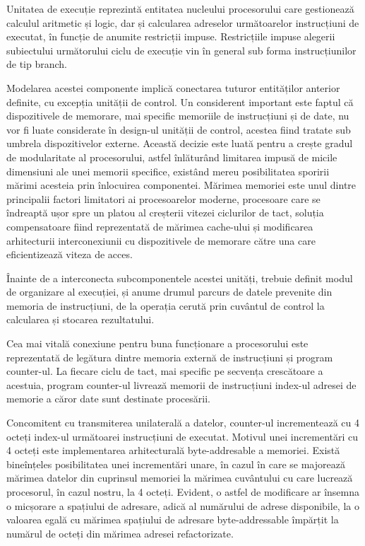 \documentclass[12pt]{article}
\begin{document}
Unitatea de execuție reprezintă entitatea nucleului procesorului care gestionează calculul aritmetic și logic, dar și calcularea adreselor următoarelor instrucțiuni de executat, în funcție de anumite restricții impuse. Restricțiile impuse alegerii subiectului următorului ciclu de execuție vin în general sub forma instrucțiunilor de tip branch. 
 
Modelarea acestei componente implică conectarea tuturor entităților anterior definite, cu excepția unității de control. Un considerent important este faptul că dispozitivele de memorare, mai specific memoriile de instrucțiuni și de date, nu vor fi luate considerate în design-ul unității de control, acestea fiind tratate sub umbrela dispozitivelor externe. Această decizie este luată pentru a crește gradul de modularitate al procesorului, astfel înlăturând limitarea impusă de micile dimensiuni ale unei memorii specifice, existând mereu posibilitatea sporirii mărimi acesteia prin înlocuirea componentei. Mărimea memoriei este unul dintre principalii factori limitatori ai procesoarelor moderne, procesoare care se îndreaptă ușor spre un platou al creșterii vitezei ciclurilor de tact, soluția compensatoare fiind reprezentată de mărimea cache-ului și modificarea arhitecturii interconexiunii cu dispozitivele de memorare către una care eficientizează viteza de acces.

Înainte de a interconecta subcomponentele acestei unități, trebuie definit modul de organizare al execuției, și anume drumul parcurs de datele prevenite din memoria de instrucțiuni, de la operația cerută prin cuvântul de control la calcularea și stocarea rezultatului.

Cea mai vitală conexiune pentru buna funcționare a procesorului este reprezentată de legătura dintre memoria externă de instrucțiuni și program counter-ul. La fiecare ciclu de tact, mai specific pe secvența crescătoare a acestuia, program counter-ul livrează memorii de instrucțiuni index-ul adresei de memorie a căror date sunt destinate procesării.

 Concomitent cu transmiterea unilaterală a datelor, counter-ul incrementează cu 4 octeți index-ul următoarei instrucțiuni de executat. Motivul unei incrementări cu 4 octeți este implementarea arhitecturală byte-addresable a memoriei. Există bineînțeles posibilitatea unei incrementări unare, în cazul în care se majorează mărimea datelor din cuprinsul memoriei la mărimea cuvântului cu care lucrează procesorul, în cazul nostru, la 4 octeți. Evident, o astfel de modificare ar însemna o micșorare a spațiului de adresare, adică al numărului de adrese disponibile, la o valoarea egală cu mărimea spațiului de adresare byte-addressable împărțit la numărul de octeți din mărimea adresei refactorizate.
 
\end{document}
